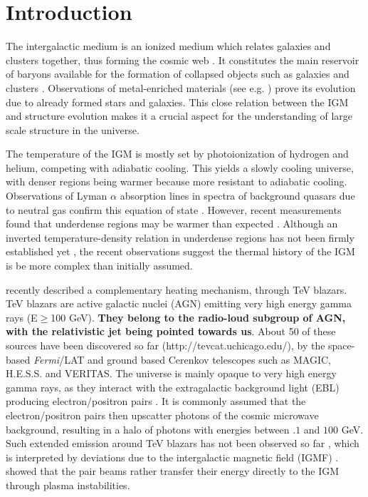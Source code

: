 \documentclass[twocolumns]{emulateapj}
\newcommand\ALc[1]{{\color{red} \bf #1}} %
\begin{document}
\section{Introduction}
The intergalactic medium is an ionized medium which relates galaxies and clusters together, thus forming the cosmic web \citep{1996Natur.380..603B}. It constitutes the main reservoir of baryons available for the formation of collapsed objects such as galaxies and clusters \citep{1997ApJ...489....7R}. Observations of metal-enriched materials (see e.g. \citet{2009A&A...493..409S,2010MNRAS.407.2063W}) prove its evolution due to already formed stars and galaxies. This close relation between the IGM and structure evolution makes it a  crucial aspect for the understanding of large scale structure in the universe.

The temperature of the IGM is mostly set by photoionization of hydrogen  and helium, competing with adiabatic cooling. This yields a slowly cooling universe, with denser regions being warmer because more resistant to adiabatic cooling. Observations of Lyman $\alpha$ absorption lines in spectra of background quasars due to neutral gas confirm this equation of state \citep{2000MNRAS.318..817S,2000ApJ...534...41R,2012ApJ...757L..30R}. However, recent measurements found that underdense regions may be warmer than expected \citep{2009MNRAS.399L..39V,2008MNRAS.386.1131B,2014MNRAS.441.1916B}. Although an inverted temperature-density relation in underdense regions has not been firmly established yet \citep{2014MNRAS.tmp...52B}, the recent observations suggest the thermal history of the IGM is be more complex than initially assumed.



\citet{2012ApJ...752...22B} recently described a complementary heating mechanism, through TeV blazars. TeV blazars are active galactic nuclei (AGN) emitting  very high energy gamma rays (E$\ge$100 GeV). \ALc{They belong to the radio-loud subgroup of AGN, with the relativistic jet being pointed towards us}.  About 50 of these sources have been discovered so far (http://tevcat.uchicago.edu/), by the space-based \textit{Fermi}/LAT and ground based Cerenkov telescopes such as MAGIC, H.E.S.S. and VERITAS. The universe is mainly opaque to  very high energy  gamma rays, as they interact with the extragalactic background light (EBL) producing electron/positron pairs \citep{1967PhRv..155.1408G,1992ApJ...390L..49S}.  It is commonly assumed that the electron/positron pairs then upscatter photons of the cosmic microwave background, resulting in  a halo of photons with energies between $.1$ and $100$ GeV. Such extended emission around TeV blazars has not been observed so far \citep{2010A&A...524A..77A,2014arXiv1401.2915H}, which is interpreted by deviations due to the intergalactic magnetic field (IGMF) \citep{2013A&ARv..21...62D,2012ApJ...747L..14V,2011ApJ...733L..21D}. \citet{2012ApJ...752...22B} showed that the pair beams rather transfer their energy directly to the IGM through plasma instabilities.
\end{document}
